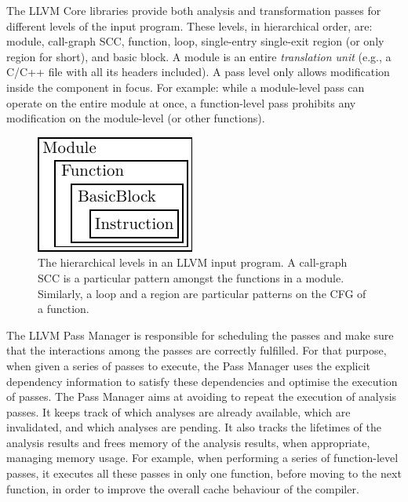 The LLVM Core libraries provide both analysis and transformation passes for different levels of the input program.
These levels, in hierarchical order, are: module, call-graph SCC, function, loop, single-entry single-exit region (or only region for short), and basic block.
A module is an entire \textit{translation unit} (e.g., a C/C++ file with all its headers included).
A pass level only allows modification inside the component in focus.
For example: while a module-level pass can operate on the entire module at once,
a function-level pass prohibits any modification on the module-level (or other functions).

\begin{figure}[h]
  \centering
  \includegraphics[scale=1]{figs/llvm-containers.pdf}
  \caption{The hierarchical levels in an LLVM input program. A call-graph SCC is a particular pattern amongst the functions in a module.
Similarly, a loop and a region are particular patterns on the CFG of a function.}
  \label{fig:llvm-containers}
\end{figure}


The LLVM Pass Manager is responsible for scheduling the passes and make sure that the interactions among the passes are correctly fulfilled.
For that purpose, when given a series of passes to execute, the Pass Manager uses the explicit dependency information to satisfy these dependencies and optimise the execution of passes.
The Pass Manager aims at avoiding to repeat the execution of analysis passes.
It keeps track of which analyses are already available, which are invalidated, and which analyses are pending.
It also tracks the lifetimes of the analysis results and frees memory of the analysis results, when appropriate, managing memory usage.
For example, when performing a series of function-level passes, it executes all these passes in only one function, before moving to the next function, in order to improve the overall cache behaviour of the compiler.

